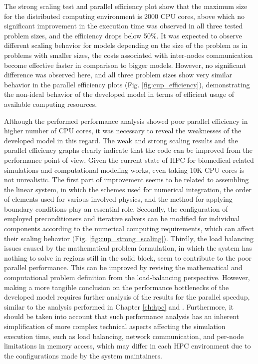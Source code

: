 The strong scaling test and parallel efficiency plot show that the maximum size for the distributed computing environment is \num{2000} \gls{CPU} cores, above which no significant improvement in the execution time was observed in all three tested problem sizes, and the efficiency drops below 50\%. It was expected to observe different scaling behavior for models depending on the size of the problem as in problems with smaller sizes, the costs associated with inter-nodes communication become effective faster in comparison to bigger models. However, no significant difference was observed here, and all three problem sizes show very similar behavior in the parallel efficiency plots (Fig. \ref{fig:cup_efficiency}), demonstrating the non-ideal behavior of the developed model in terms of efficient usage of available computing resources. 

Although the performed performance analysis showed poor parallel efficiency in higher number of \gls{CPU} cores, it was necessary to reveal the weaknesses of the developed model in this regard. The weak and strong scaling results and the parallel efficiency graphs clearly indicate that the code can be improved from the performance point of view. Given the current state of \gls{HPC} for biomedical-related simulations and computational modeling works,  even taking 10K \gls{CPU} cores is not unrealistic. The first part of improvement seems to be related to assembling the linear system, in which the schemes used for numerical integration, the order of elements used for various involved physics, and the method for applying boundary conditions play an essential role. Secondly, the configuration of employed preconditioners and iterative solvers can be modified for individual components according to the numerical computing requirements, which can affect their scaling behavior (Fig. \ref{fig:cup_strong_scaling}). Thirdly, the load balancing issues caused by the mathematical problem formulation, in which the system has nothing to solve in regions still in the solid block, seem to contribute to the poor parallel performance. This can be improved by revising the mathematical and computational problem definition from the load-balancing perspective. However, making a more tangible conclusion on the performance bottlenecks of the developed model requires further analysis of the results for the parallel speedup, similar to the analysis performed in Chapter \ref{ch:hpc} and \cite{Barzegari2022}. Furthermore, it should be taken into account that such performance analysis has an inherent simplification of more complex technical aspects affecting the simulation execution time, such as load balancing, network communication, and per-node limitations in memory access, which may differ in each \gls{HPC} environment due to the configurations made by the system maintainers.

